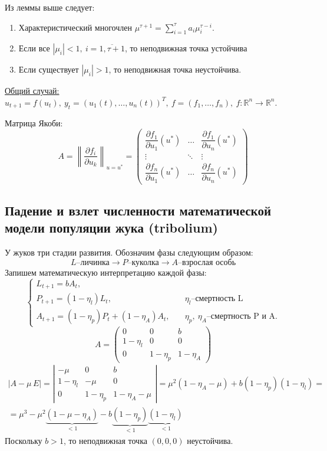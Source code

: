 Из леммы выше следует:
\begin{enumerate}
\item Характеристический многочлен $\mu^{\tau+1}=\sum\limits_{i=1}^{\tau}a_i\mu_i^{\tau-i}$.
\item Если все $|\mu_i|<1,\: i=\overline{1,\tau+1}$, то неподвижная точка устойчива 
\item Если существует $|\mu_i|>1$, то неподвижная точка неустойчива. 
\end{enumerate}

\underline{Общий случай:} $u_{t+1}=f(u_t),\ y_t=\left(u_1(t),\dots,u_n(t)\right)^T,\ f=(f_1,\dots,f_n),\ f:\mathbb{R}^n\rightarrow\mathbb{R}^n$.

Матрица Якоби: 
$$
A=\left\|\dfrac{\partial f_i}{\partial u_k}\right\|_{u=u^*}=
\begin{pmatrix}
\dfrac{\partial f_1}{\partial u_1}(u^*) &\dots &\dfrac{\partial f_1}{\partial u_n}(u^*) \\
\vdots &\ddots & \vdots \\
\dfrac{\partial f_n}{\partial u_1}(u^*)&\dots&\dfrac{\partial f_n}{\partial u_n}(u^*)
\end{pmatrix}
$$
\subsection{Падение и взлет численности математической модели популяции жука (tribolium)}
У жуков три стадии развития. Обозначим фазы следующим образом:
$$
L\textbf{--личинка}\longrightarrow P\textbf{--куколка}\longrightarrow A\textbf{--взрослая особь}
$$
Запишем математическую интерпретацию каждой фазы:
$$
\begin{cases}
L_{t+1}=bA_t,  \\
P_{t+1}=(1-\eta_l)L_t,\quad &\text{$\eta_l$--смертность L}\\
A_{t+1}=(1-\eta_p)P_t + (1-\eta_A)A_t,\quad &\text{$\eta_p,\ \eta_A$--смертность P и A}. 
\end{cases}
$$
$$
A=
\begin{pmatrix}
0 & 0 & b \\
1-\eta_l & 0 & 0 \\
0 & 1-\eta_p & 1-\eta_A 
\end{pmatrix}
$$
\begin{multline*}
\left|A-\mu\,E\right| = 
\left|
\begin{matrix}
-\mu & 0 & b \\
1-\eta_l & -\mu & 0 \\
0 & 1-\eta_p & 1-\eta_A -\mu
\end{matrix}
\right| =
\mu^2(1-\eta_A-\mu)+b(1-\eta_p)(1-\eta_l) =\\
= \mu^3 - \mu^2\underbrace{(1-\mu-\eta_A)}_{<1} - b\underbrace{(1-\eta_p)}_{<1}\underbrace{(1-\eta_l)}_{<1}
\end{multline*}
Поскольку $b > 1$, то неподвижная точка $(0,0,0)$ неустойчива.


